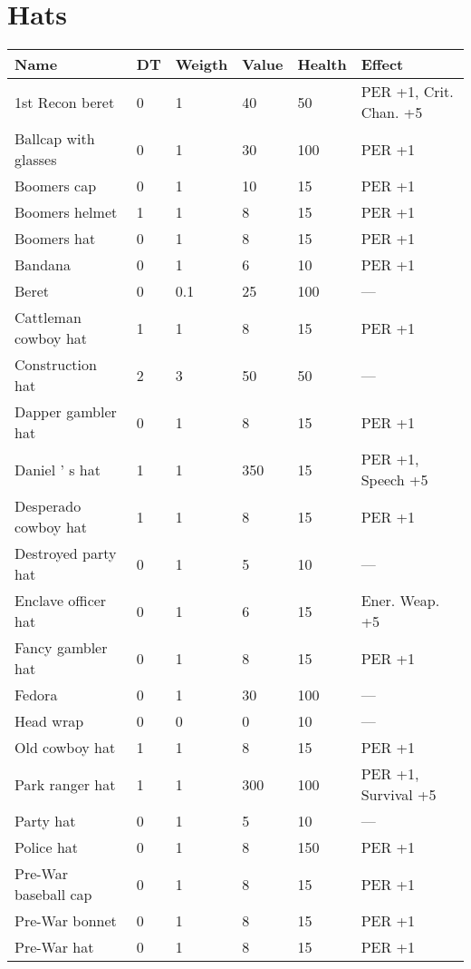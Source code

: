 \documentclass{report}
\begin{document}
\begin{table}[H]
\begin{table}[H]
\begin{table}[H]
\begin{table}[H]
\begin{table}[H]
\begin{table}[H]
\begin{table}[H]
\begin{table}[H]
\begin{table}[H]
\begin{table}[H]
\begin{table}[H]
\begin{table}[H]
\begin{table}[H]
\begin{table}[H]
\begin{table}[H]
\begin{table}[H]
\begin{table}[H]
\begin{table}[H]
\begin{table}[H]
\begin{table}[H]
\begin{table}[H]
\chapter{Hats}
\begin{table}[H]
  \centering
  \begin{tabular}{p{30mm}p{30mm}p{30mm}p{30mm}p{30mm}p{30mm}}
\bfseries Name & \bfseries DT & \bfseries Weigth & \bfseries Value & \bfseries Health & \bfseries Effect \\
\hline
1st Recon beret  & 0 & 1 & 40 & 50 & PER +1, Crit. Chan. +5  \\
Ballcap with glasses  & 0 & 1 & 30 & 100 & PER +1  \\
Boomers cap  & 0 & 1 & 10 & 15 & PER +1  \\
Boomers helmet  & 1 & 1 & 8 & 15 & PER +1  \\
Boomers hat  & 0 & 1 & 8 & 15 & PER +1  \\
Bandana  & 0 & 1 & 6 & 10 & PER +1  \\
Beret  & 0 & 0.1  & 25 & 100 & —  \\
Cattleman cowboy hat  & 1 & 1 & 8 & 15 & PER +1  \\
Construction hat  & 2 & 3 & 50 & 50 & —  \\
Dapper gambler hat  & 0 & 1 & 8 & 15 & PER +1  \\
Daniel ' s hat  & 1 & 1 & 350 & 15 & PER +1, Speech +5  \\
Desperado cowboy hat  & 1 & 1 & 8 & 15 & PER +1  \\
Destroyed party hat  & 0 & 1 & 5 & 10 & —  \\
Enclave officer hat  & 0 & 1 & 6 & 15 & Ener. Weap. +5  \\
Fancy gambler hat  & 0 & 1 & 8 & 15 & PER +1  \\
Fedora  & 0 & 1 & 30 & 100 & —  \\
Head wrap  & 0 & 0 & 0 & 10 & —  \\
Old cowboy hat  & 1 & 1 & 8 & 15 & PER +1  \\
Park ranger hat  & 1 & 1 & 300 & 100 & PER +1, Survival +5  \\
Party hat  & 0 & 1 & 5 & 10 & —  \\
Police hat  & 0 & 1 & 8 & 150 & PER +1  \\
Pre-War baseball cap  & 0 & 1 & 8 & 15 & PER +1  \\
Pre-War bonnet  & 0 & 1 & 8 & 15 & PER +1  \\
Pre-War hat  & 0 & 1 & 8 & 15 & PER +1  \\

\end{tabular}
\end{table}
\end{table}
\end{table}
\end{table}
\end{table}
\end{table}
\end{table}
\end{table}
\end{table}
\end{table}
\end{table}
\end{table}
\end{table}
\end{table}
\end{table}
\end{table}
\end{table}
\end{table}
\end{table}
\end{table}
\end{table}
\end{table}
\end{document}
